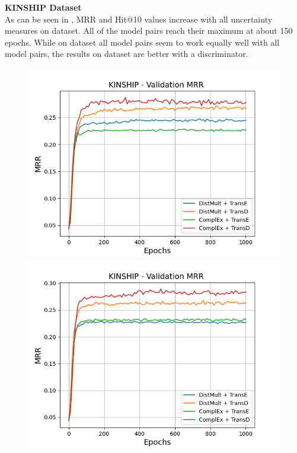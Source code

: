 \textbf{KINSHIP Dataset}
\label{subsubsec:metrics_kinship}\\
%
As can be seen in , MRR and Hit@10 values increase with all uncertainty measures on \kinship dataset.
All of the model pairs reach their maximum at about 150 epochs.
While on \umls dataset all model pairs seem to work equally well with all model pairs, the results on \kinship dataset are better with a \transd discriminator.
\begin{figure}[H]
    \centering
    \begin{minipage}{.5\textwidth}
      \centering
      \includegraphics[width=0.9\linewidth]{figures/results/gan_train/not_pretrained/uncertainty/max_distribution/entropy/kinship/1k_epochs/uncertainty_kinship_mrrs.png}
    \end{minipage}%
    \begin{minipage}{.5\textwidth}
      \centering
      \includegraphics[width=0.9\linewidth]{figures/results/gan_train/not_pretrained/uncertainty/max_distribution/least_confidence/kinship/uncertainty_kinship_mrrs.png}

\end{minipage}
\end{figure}
